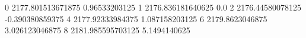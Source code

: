 0 2177.801513671875 0.96533203125
1 2176.836181640625 0.0
2 2176.44580078125 -0.390380859375
4 2177.92333984375 1.087158203125
6 2179.8623046875 3.026123046875
8 2181.985595703125 5.1494140625
